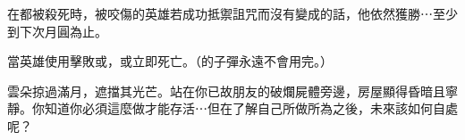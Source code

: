 在都被殺死時，被咬傷的英雄若成功抵禦詛咒而沒有變成的話，他依然獲勝⋯至少到下次月圓為止。

當英雄使用擊敗或，或立即死亡。（的子彈永遠不會用完。）

\begin{HauntStory}
  雲朵掠過滿月，遮擋其光芒。站在你已故朋友的破爛屍體旁邊，房屋顯得昏暗且寧靜。你知道你必須這麼做才能存活⋯但在了解自己所做所為之後，未來該如何自處呢？
\end{HauntStory}
